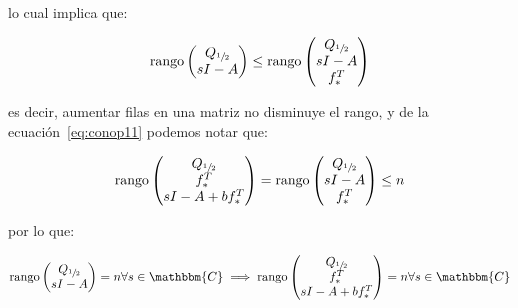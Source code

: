         lo cual implica que:

        \begin{equation*}
            \operatorname{rango}{\begin{pmatrix} Q_{\sfrac{1}{2}} \\ sI - A \end{pmatrix}} \le \operatorname{rango}{\begin{pmatrix} Q_{\sfrac{1}{2}} \\ sI - A \\ f_*^T \end{pmatrix}}
        \end{equation*}

        es decir, aumentar filas en una matriz no disminuye el rango, y de la ecuación~\ref{eq:conop11} podemos notar que:

        \begin{equation}
            \operatorname{rango}{\begin{pmatrix} Q_{\sfrac{1}{2}} \\ f_*^T \\ sI - A + b f_*^T \end{pmatrix}} = \operatorname{rango}{\begin{pmatrix} Q_{\sfrac{1}{2}} \\ sI - A \\ f_*^T \end{pmatrix}} \le n
        \end{equation}

        por lo que:

        \begin{equation}
            \rango{\begin{pmatrix} Q_{\sfrac{1}{2}} \\ sI - A \end{pmatrix}} = n \forall s \in \mathbbm{C} \implies \rango{\begin{pmatrix} Q_{\sfrac{1}{2}} \\ f_*^T \\ sI - A + b f_*^T \end{pmatrix}} = n \forall s \in \mathbbm{C}
        \end{equation}

